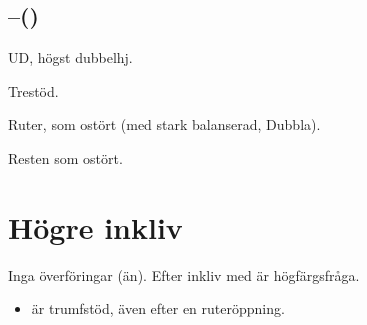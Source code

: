 \subsection{--()}

\bbe
\item[D] UD, högst dubbelhj.
\item[\NT{1}] Trestöd.
\item[\kl{2}] Ruter, som ostört (med stark balanserad, Dubbla).
\ebe

Resten som ostört.

\section{Högre inkliv}

Inga överföringar (än). Efter inkliv med  är  högfärgsfråga.

\begin{itemize}

\item {} är trumfstöd, även efter en ruteröppning.


\end{itemize}









